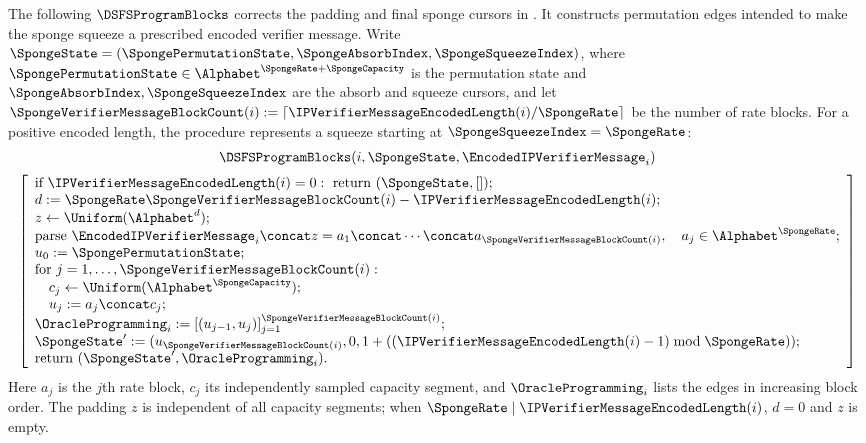 \begin{definition}
  The following \(\DSFSProgramBlocks\) corrects the padding and final sponge cursors in \cite[Construction~7.5]{CO25}. It constructs permutation edges intended to make the sponge squeeze a prescribed encoded verifier message. Write \(\SpongeState=(\SpongePermutationState,\SpongeAbsorbIndex,\SpongeSqueezeIndex)\), where \(\SpongePermutationState\in\Alphabet^{\SpongeRate+\SpongeCapacity}\) is the permutation state and \(\SpongeAbsorbIndex,\SpongeSqueezeIndex\) are the absorb and squeeze cursors, and let \(\SpongeVerifierMessageBlockCount(i):=\lceil\IPVerifierMessageEncodedLength(i)/\SpongeRate\rceil\) be the number of rate blocks. For a positive encoded length, the procedure represents a squeeze starting at \(\SpongeSqueezeIndex=\SpongeRate\):
  \begin{equation*}
  \begin{gathered}
    \DSFSProgramBlocks(i,\SpongeState,\EncodedIPVerifierMessage_i)\\[2pt]
    \left[\begin{array}{l}
      \text{if }\IPVerifierMessageEncodedLength(i)=0:\ \text{return }(\SpongeState,[]);\\
      d:=\SpongeRate\SpongeVerifierMessageBlockCount(i)-\IPVerifierMessageEncodedLength(i);\\
      z\leftarrow\Uniform(\Alphabet^d);\\
      \text{parse }\EncodedIPVerifierMessage_i\concat z=a_1\concat\cdots\concat a_{\SpongeVerifierMessageBlockCount(i)},
        \quad a_j\in\Alphabet^{\SpongeRate};\\
      u_0:=\SpongePermutationState;\\
      \text{for }j=1,\ldots,\SpongeVerifierMessageBlockCount(i):\\
      \quad c_j\leftarrow\Uniform(\Alphabet^{\SpongeCapacity});\\
      \quad u_j:=a_j\concat c_j;\\
      \OracleProgramming_i:=[(u_{j-1},u_j)]_{j=1}^{\SpongeVerifierMessageBlockCount(i)};\\
      \SpongeState':=(u_{\SpongeVerifierMessageBlockCount(i)},0,1+((\IPVerifierMessageEncodedLength(i)-1)\bmod \SpongeRate));\\
      \text{return }(\SpongeState',\OracleProgramming_i).
    \end{array}\right]
  \end{gathered}
  \end{equation*}
  Here \(a_j\) is the \(j\)th rate block, \(c_j\) its independently sampled capacity segment, and \(\OracleProgramming_i\) lists the edges in increasing block order. The padding \(z\) is independent of all capacity segments; when \(\SpongeRate\mid\IPVerifierMessageEncodedLength(i)\), \(d=0\) and \(z\) is empty.

  \leanok
\end{definition}

